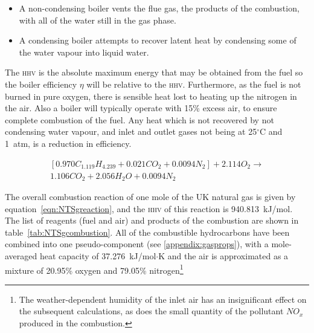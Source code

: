 \documentclass[5p]{elsarticle} %
\begin{document}
\begin{itemize}
    \item A non-condensing boiler vents the flue gas, the products of the combustion, with all of the water still in the gas phase.
    \item A condensing boiler attempts to recover latent heat by condensing some of the water vapour into liquid water. 
\end{itemize}

The \textsc{hhv} is the absolute maximum energy that may be obtained from the fuel
so the boiler efficiency $\eta$ will be relative to the \textsc{hhv}\citep{saty2018}.
Furthermore, as the fuel is not burned in pure oxygen, there is sensible heat lost to heating up the nitrogen in the air. 
Also a  boiler will typically operate with 15\% excess air, to ensure complete combustion of the fuel\citep{CleaverBooks2016}.
Any heat which is not recovered by not condensing water vapour, and inlet and outlet gases not being at 25$^\circ$C and 1~atm, is a reduction in efficiency\citep{saty2018}.

\begin{multline}
    \label{eqn:NTSgreaction}
    [0.970 C_{1.119} H_{4.239} + 0.021 C O_2 + 0.0094 N_2] + 2.114 O_2 \longrightarrow \\
    1.106 C O_2 + 2.056 H_2 O + 0.0094 N_2
\end{multline}

The overall combustion reaction of one mole of the UK natural gas is given by equation~\eqref{eqn:NTSgreaction}, and the \textsc{hhv} of this reaction is 940.813~kJ/mol\citep{nist_delta_H}.
The list of reagents (fuel and air) and products of the combustion are shown in table~\ref{tab:NTSgcombustion}.
All of the combustible hydrocarbons have been combined into one pseudo-component\citep{coolprop} (see \ref{appendix:gasprops}), with a mole-averaged heat capacity of 37.276~kJ/mol$\cdot$K\citep{Huber2022} and the air is approximated as a mixture of 20.95\% oxygen and 79.05\% nitrogen\footnote{The weather-dependent humidity of the inlet air has an insignificant effect on the subsequent calculations, as does the small quantity of the pollutant $NO_{x}$ produced in the combustion.}
\end{document}
